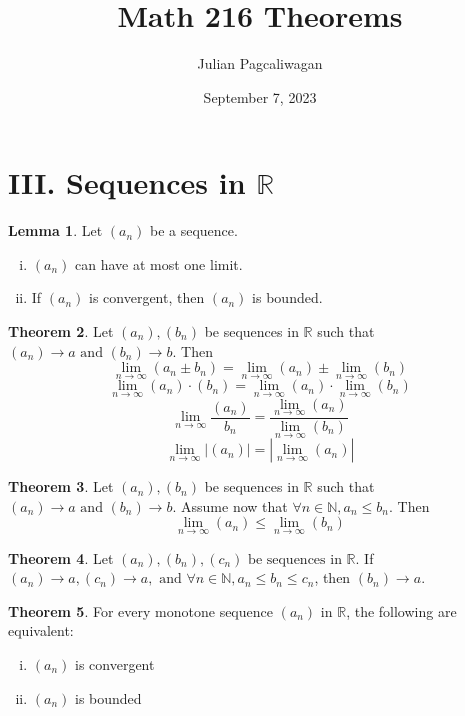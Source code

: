 \documentclass{report}
\title{Math 216 Theorems}
\author{Julian Pagcaliwagan}
\date{September 7, 2023}
\theoremstyle{definition}
\begin{document}
\maketitle

\newtheorem{t1}{Theorem}


\section*{III. Sequences in $\mathbb{R}$}
\newtheorem{seqt}{Theorem}
\newtheorem{seql}[seqt]{Lemma}
\newtheorem{seqc}[seqt]{Corollary}
\newtheorem{seqp}[seqt]{Proposition}

\begin{seql} Let $(a_n)$ be a sequence.
    \begin{enumerate}[(i)]
        \item $(a_n)$ can have at most one limit.
        \item If $(a_n)$ is convergent, then $(a_n)$ is bounded.
    \end{enumerate}
\end{seql}

\begin{seqt}
    Let $(a_n), (b_n)$ be sequences in $\mathbb{R}$ such that $(a_n) \rightarrow a \text{ and } (b_n) \rightarrow b$. Then
        \[ \lim_{n\to\infty} (a_n \pm b_n) = \lim_{n\to\infty} (a_n) \pm \lim_{n\to\infty} (b_n)\] 
        \[ \lim_{n\to\infty} (a_n) \cdot (b_n) = \lim_{n\to\infty} (a_n) \cdot \lim_{n\to\infty} (b_n)\]
        \[ \lim_{n\to\infty} \frac{(a_n)}{b_n} = \frac{\lim_{n\to\infty} (a_n)}{\lim_{n\to\infty} (b_n)}\]
        \[ \lim_{n\to\infty} |(a_n)| = |\lim_{n\to\infty} (a_n)|\]
\end{seqt}

\begin{seqt}
    Let $(a_n), (b_n)$ be sequences in $\mathbb{R}$ such that $(a_n) \rightarrow a \text{ and } (b_n) \rightarrow b$. Assume now that
    $\forall n\in\mathbb{N}, a_n\leq b_n.$ Then
    \[ \lim_{n\to\infty} (a_n) \leq \lim_{n\to\infty} (b_n)\]
\end{seqt}

\begin{seqt}
    Let $(a_n), (b_n), (c_n)\text{ be sequences in }\mathbb{R}.$ If $(a_n)\to a, (c_n)\to a, \text{ and } \forall n\in\mathbb{N}, a_n \leq b_n \leq c_n$,
    then $(b_n)\to a$. 
\end{seqt}

\begin{seqt}
    For every monotone sequence $(a_n) \text{ in } \mathbb{R}$, the following are equivalent:
    \begin{enumerate}[(i)]
        \item $(a_n)$ is convergent
        \item $(a_n)$ is bounded
    \end{enumerate}
\end{seqt}
\end{document}
